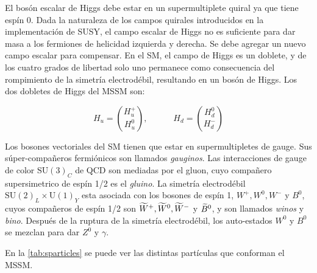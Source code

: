 El bosón escalar de Higgs debe estar en un supermultiplete quiral ya que tiene
espín 0. Dada la naturaleza de los campos quirales introducidos en la
implementación de SUSY, el campo escalar de Higgs no es suficiente para dar masa
a los fermiones de helicidad izquierda y derecha. Se debe agregar un nuevo campo
escalar para compensar. En el SM, el campo de Higgs es un doblete, y de los
cuatro grados de libertad solo uno permanece como consecuencia del rompimiento
de la simetría electrodébil, resultando en un bosón de Higgs. Los dos dobletes
de Higgs del MSSM son:

\begin{equation}
  H_u = \binom{H_u^+}{H_u^0}, \quad \quad \quad H_d = \binom{H_d^0}{H_d^-}
\end{equation}

Los bosones vectoriales del SM tienen que estar en supermultipletes de gauge.
Sus súper-compañeros fermiónicos son llamados \emph{gauginos}. Las interacciones
de gauge de color $\text{SU}(3)_C$ de QCD son mediadas por el gluon, cuyo
compañero supersimetrico de espín 1/2 es el \emph{gluino}. La simetría
electrodébil $\text{SU}(2)_L \times \text{U}(1)_Y$ esta asociada con los bosones
de espín 1, $W^+, W^0, W^-$ y $B^0$, cuyos compañeros de espín 1/2 son $\widetilde{W}^+,
\widetilde{W}^0, \widetilde{W}^-$ y $\widetilde{B}^0$, y son llamados \emph{winos} y
\emph{bino}. Después de la ruptura de la simetría electrodébil, los auto-estados
$W^0$ y $B^0$ se mezclan para dar $Z^0$ y $\gamma$.

En la \cref{tab:sparticles} se puede ver las distintas partículas que
conforman el MSSM.


